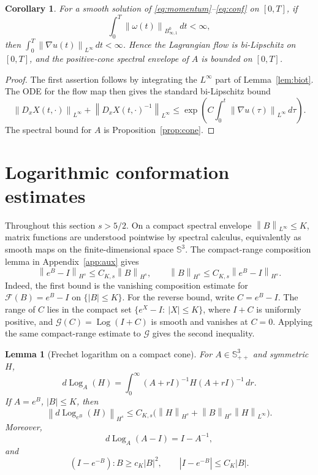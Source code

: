 \documentclass[11pt]{article}
\numberwithin{equation}{section}
\newtheorem{lemma}[theorem]{Lemma}
\newtheorem{corollary}[theorem]{Corollary}
\newcommand{\Id}{I}
\newcommand{\Spp}{\mathbb S_{++}}
\newcommand{\Sym}{\mathbb S}
\newcommand{\Log}{\operatorname{Log}}
\newcommand{\Besov}{B^0_{\infty,1}}
\newcommand{\norm}[1]{\left\lVert #1\right\rVert}
\begin{document}
\begin{corollary}
\label{cor:flow-cone}
For a smooth solution of \eqref{eq:momentum}--\eqref{eq:conf} on \([0,T]\),
if
\[
  \int_0^T\norm{\omega(t)}_{\Besov}\,dt<\infty,
\]
then \(\int_0^T\norm{\nabla u(t)}_{L^\infty}\,dt<\infty\).  Hence the
Lagrangian flow is bi-Lipschitz on \([0,T]\), and the positive-cone spectral
envelope of \(A\) is bounded on \([0,T]\).
\end{corollary}

\begin{proof}
The first assertion follows by integrating the \(L^\infty\) part of
Lemma~\ref{lem:biot}.  The ODE for the flow map then gives the standard
bi-Lipschitz bound
\[
  \norm{D_xX(t,\cdot)}_{L^\infty}
  +\norm{D_xX(t,\cdot)^{-1}}_{L^\infty}
  \le
  \exp\left(C\int_0^t\norm{\nabla u(\tau)}_{L^\infty}\,d\tau\right).
\]
The spectral bound for \(A\) is Proposition~\ref{prop:cone}.
\end{proof}

\section{Logarithmic conformation estimates}

Throughout this section \(s>5/2\).  On a compact spectral envelope
\(\norm{B}_{L^\infty}\le K\), matrix functions are understood pointwise by
spectral calculus, equivalently as smooth maps on the finite-dimensional
space \(\Sym^3\).  The compact-range composition lemma in
Appendix~\ref{app:aux} gives
\begin{equation}
  \norm{e^B-\Id}_{H^s}\le C_{K,s}\norm{B}_{H^s},
  \qquad
  \norm{B}_{H^s}\le C_{K,s}\norm{e^B-\Id}_{H^s}.
  \label{eq:matrix-moser}
\end{equation}
Indeed, the first bound is the vanishing composition estimate for
\(\mathcal F(B)=e^B-\Id\) on \(\{|B|\le K\}\).  For the reverse bound, write
\(C=e^B-\Id\).  The range of \(C\) lies in the compact set
\(\{e^X-\Id:\ |X|\le K\}\), where \(I+C\) is uniformly positive, and
\(\mathcal G(C)=\Log(I+C)\) is smooth and vanishes at \(C=0\).  Applying the
same compact-range estimate to \(\mathcal G\) gives the second inequality.

\begin{lemma}[Frechet logarithm on a compact cone]
\label{lem:frechet-log}
For \(A\in\Spp^3\) and symmetric \(H\),
\begin{equation}
  d\Log_A(H)=
  \int_0^\infty (A+r\Id)^{-1}H(A+r\Id)^{-1}\,dr .
  \label{eq:loewner}
\end{equation}
If \(A=e^B\), \(|B|\le K\), then
\begin{equation}
  \norm{d\Log_{e^B}(H)}_{H^s}
  \le
  C_{K,s}\bigl(\norm{H}_{H^s}+\norm{B}_{H^s}\norm{H}_{L^\infty}\bigr).
  \label{eq:frechet-tame}
\end{equation}
Moreover,
\begin{equation}
  d\Log_A(A-\Id)=\Id-A^{-1},
  \label{eq:log-relax-exact}
\end{equation}
and
\[
  (\Id-e^{-B}):B\ge c_K|B|^2,\qquad
  |\Id-e^{-B}|\le C_K|B|.
\]
\end{lemma}
\end{document}
